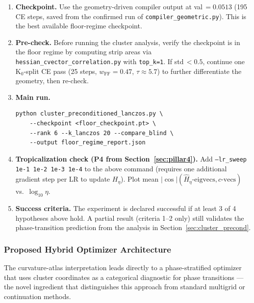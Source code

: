\documentclass[11pt]{amsart}
\begin{document}
\begin{enumerate}
\item \textbf{Checkpoint.}
  Use the geometry-driven compiler output at val\,$=0.0513$
  (195 CE steps, saved from the confirmed run of
  \texttt{compiler\_geometric.py}).
  This is the best available floor-regime checkpoint.

\item \textbf{Pre-check.}
  Before running the cluster analysis, verify the checkpoint is in
  the floor regime by computing strip areas via
  \texttt{hessian\_cvector\_correlation.py} with \texttt{top\_k=1}.
  If std\,$< 0.5$, continue one K$_0$-split CE pass
  (25 steps, $w_\mathrm{FF} = 0.47$, $\tau \approx 5.7$) to
  further differentiate the geometry, then re-check.

\item \textbf{Main run.}
\begin{verbatim}
python cluster_preconditioned_lanczos.py \
    --checkpoint <floor_checkpoint.pt> \
    --rank 6 --k_lanczos 20 --compare_blind \
    --output floor_regime_report.json
\end{verbatim}

\item \textbf{Tropicalization check (P4 from Section~\ref{sec:pillar4}).}
  Add \texttt{--lr\_sweep 1e-1 1e-2 1e-3 1e-4} to the above command
  (requires one additional gradient step per LR to update $H_\eta$).
  Plot mean $|\cos|(\hat{H}_\eta\text{-eigvecs}, c\text{-vecs})$
  vs.\ $\log_{10}\eta$.

\item \textbf{Success criteria.}
  The experiment is declared successful if at least 3 of 4 hypotheses
  above hold.
  A partial result (criteria 1--2 only) still validates the
  phase-transition prediction from the analysis in
  Section~\ref{sec:cluster_precond}.
\end{enumerate}

\subsubsection*{Proposed Hybrid Optimizer Architecture}

The curvature-atlas interpretation leads directly to a phase-stratified
optimizer that uses cluster coordinates as a categorical diagnostic
for phase transitions --- the novel ingredient that distinguishes
this approach from standard multigrid or continuation methods.
\end{document}
